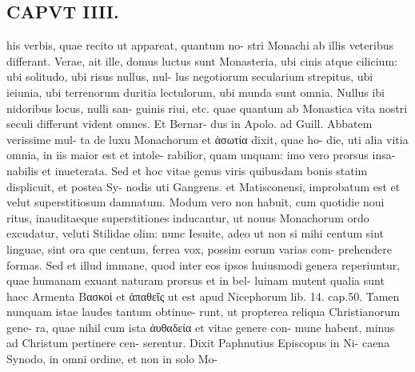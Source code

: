 \documentclass{article}
\begin{document}
\begin{pages}
\section*{CAPVT  IIII. }
\marginpar{[ p.217 ]}his verbis, quae recito ut appareat, quantum no- stri Monachi ab illis veteribus differant. Verae, ait ille, domus luctus sunt Monasteria, ubi cinis atque cilicium: ubi solitudo, ubi risus nullus, nul- lus negotiorum secularium strepitus, ubi ieiunia, ubi terrenorum duritia lectulorum, ubi munda sunt omnia. Nullus ibi nidoribus locus, nulli san- guinis riui, etc. quae quantum ab Monastica vita nostri seculi differunt vident omnes. Et Bernar- dus in Apolo. ad Guill. Abbatem verissime mul- ta de luxu Monachorum et ἀσωτία dixit, quae ho- die, uti alia vitia omnia, in iis maior est et intole- rabilior, quam unquam: imo vero prorsus insa- nabilis et inueterata. Sed et hoc vitae genus viris quibusdam bonis statim displicuit, et postea Sy- nodis uti Gangrens. et Matisconensi, improbatum est et velut superstitiosum damnatum. Modum vero non habuit, cum quotidie noui ritus, inauditaeque superstitiones inducantur, ut nouus Monachorum ordo excudatur, veluti Stilidae olim: nunc Iesuite, adeo ut non si mihi centum sint linguae, sint ora que centum, ferrea vox, possim eorum varias com- prehendere formas. Sed et illud immane, quod inter eos ipsos huiusmodi genera reperiuntur, quae humanam exuant naturam prorsus et in bel- luinam mutent qualia sunt haec Armenta Bασκοὶ et ἀπαθεῖς ut est apud Nicephorum lib. 14. cap.50. Tamen nunquam istae laudes tantum obtinue- runt, ut propterea reliqua Christianorum gene- ra, quae nihil cum ista ἀυθαδεία et vitae genere con- mune habent, minus ad Christum pertinere cen- serentur. Dixit Paphnutius Episcopus in Ni- caena Synodo, in omni ordine, et non in solo Mo- 

\end{pages}
\end{document}
